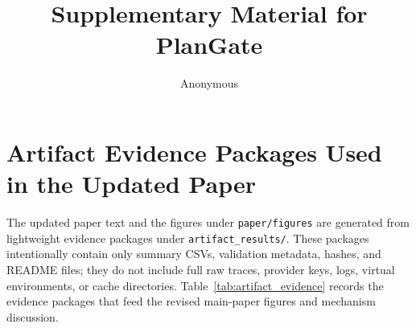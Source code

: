 \documentclass[sigconf,anonymous]{acmart}
\begin{document}
\title{Supplementary Material for PlanGate}
\author{Anonymous}
\maketitle

\section{Artifact Evidence Packages Used in the Updated Paper}
\label{sec:artifact_evidence}

The updated paper text and the figures under \texttt{paper/figures} are generated from lightweight evidence packages under \texttt{artifact\_results/}. These packages intentionally contain only summary CSVs, validation metadata, hashes, and README files; they do not include full raw traces, provider keys, logs, virtual environments, or cache directories. Table~\ref{tab:artifact_evidence} records the evidence packages that feed the revised main-paper figures and mechanism discussion.
\end{document}
